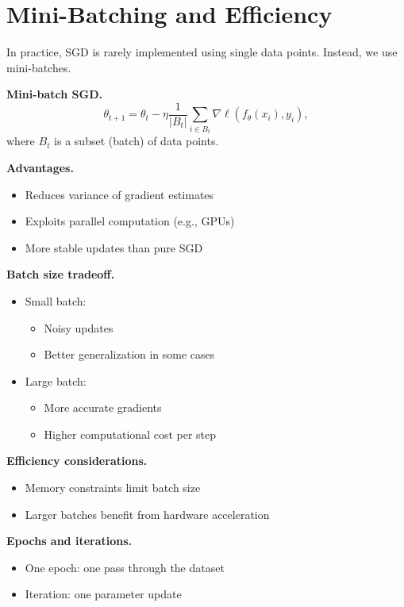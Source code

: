 \section{Mini-Batching and Efficiency}

In practice, SGD is rarely implemented using single data points. Instead, we use mini-batches.

\medskip

\noindent
\textbf{Mini-batch SGD.}
\[
\theta_{t+1} = \theta_t - \eta \frac{1}{|B_t|} \sum_{i \in B_t} \nabla \ell(f_\theta(x_i), y_i),
\]
where $B_t$ is a subset (batch) of data points.

\medskip

\noindent
\textbf{Advantages.}
\begin{itemize}
    \item Reduces variance of gradient estimates
    \item Exploits parallel computation (e.g., GPUs)
    \item More stable updates than pure SGD
\end{itemize}

\medskip

\noindent
\textbf{Batch size tradeoff.}
\begin{itemize}
    \item Small batch:
    \begin{itemize}
        \item Noisy updates
        \item Better generalization in some cases
    \end{itemize}
    \item Large batch:
    \begin{itemize}
        \item More accurate gradients
        \item Higher computational cost per step
    \end{itemize}
\end{itemize}

\medskip

\noindent
\textbf{Efficiency considerations.}
\begin{itemize}
    \item Memory constraints limit batch size
    \item Larger batches benefit from hardware acceleration
\end{itemize}

\medskip

\noindent
\textbf{Epochs and iterations.}
\begin{itemize}
    \item One epoch: one pass through the dataset
    \item Iteration: one parameter update
\end{itemize}

